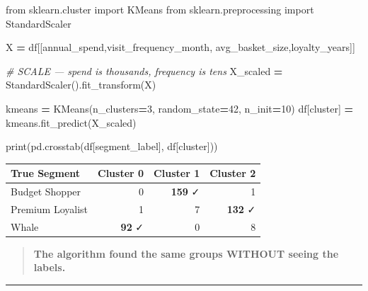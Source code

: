 \documentclass[
]{article}
\newenvironment{Shaded}{\begin{snugshade}}{\end{snugshade}}
\newcommand{\BuiltInTok}[1]{#1}
\newcommand{\CommentTok}[1]{\textcolor[rgb]{0.56,0.35,0.01}{\textit{#1}}}
\newcommand{\DecValTok}[1]{\textcolor[rgb]{0.00,0.00,0.81}{#1}}
\newcommand{\ImportTok}[1]{#1}
\newcommand{\NormalTok}[1]{#1}
\newcommand{\OperatorTok}[1]{\textcolor[rgb]{0.81,0.36,0.00}{\textbf{#1}}}
\newcommand{\StringTok}[1]{\textcolor[rgb]{0.31,0.60,0.02}{#1}}
\begin{document}
\begin{Shaded}
\begin{Highlighting}[]
\ImportTok{from}\NormalTok{ sklearn.cluster }\ImportTok{import}\NormalTok{ KMeans}
\ImportTok{from}\NormalTok{ sklearn.preprocessing }\ImportTok{import}\NormalTok{ StandardScaler}

\NormalTok{X }\OperatorTok{=}\NormalTok{ df[[}\StringTok{\textquotesingle{}annual\_spend\textquotesingle{}}\NormalTok{,}\StringTok{\textquotesingle{}visit\_frequency\_month\textquotesingle{}}\NormalTok{,}
        \StringTok{\textquotesingle{}avg\_basket\_size\textquotesingle{}}\NormalTok{,}\StringTok{\textquotesingle{}loyalty\_years\textquotesingle{}}\NormalTok{]]}

\CommentTok{\# SCALE — spend is thousands, frequency is tens}
\NormalTok{X\_scaled }\OperatorTok{=}\NormalTok{ StandardScaler().fit\_transform(X)}

\NormalTok{kmeans }\OperatorTok{=}\NormalTok{ KMeans(n\_clusters}\OperatorTok{=}\DecValTok{3}\NormalTok{, random\_state}\OperatorTok{=}\DecValTok{42}\NormalTok{, n\_init}\OperatorTok{=}\DecValTok{10}\NormalTok{)}
\NormalTok{df[}\StringTok{\textquotesingle{}cluster\textquotesingle{}}\NormalTok{] }\OperatorTok{=}\NormalTok{ kmeans.fit\_predict(X\_scaled)}

\BuiltInTok{print}\NormalTok{(pd.crosstab(df[}\StringTok{\textquotesingle{}segment\_label\textquotesingle{}}\NormalTok{], df[}\StringTok{\textquotesingle{}cluster\textquotesingle{}}\NormalTok{]))}
\end{Highlighting}
\end{Shaded}

\begin{longtable}[]{@{}lrrr@{}}
\toprule\noalign{}
True Segment & Cluster 0 & Cluster 1 & Cluster 2 \\
\midrule\noalign{}
\endhead
\bottomrule\noalign{}
\endlastfoot
Budget Shopper & 0 & \textbf{159} ✓ & 1 \\
Premium Loyalist & 1 & 7 & \textbf{132} ✓ \\
Whale & \textbf{92} ✓ & 0 & 8 \\
\end{longtable}

\begin{quote}
\textbf{The algorithm found the same groups WITHOUT seeing the labels.}
\end{quote}

\begin{center}\rule{0.5\linewidth}{0.5pt}\end{center}
\end{document}
